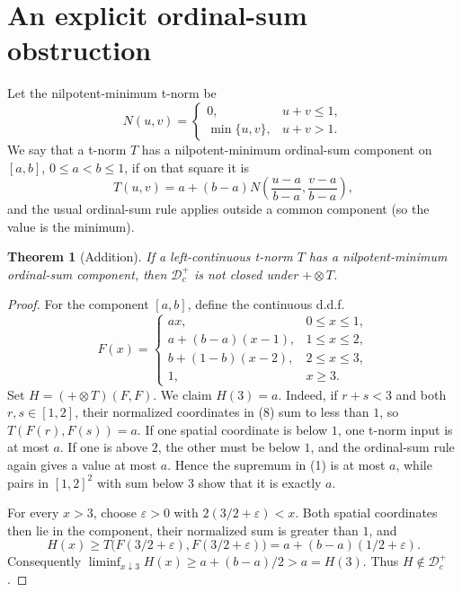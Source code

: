 \documentclass[11pt]{article}
\newtheorem{theorem}{Theorem}
\theoremstyle{remark}
\newcommand{\Dc}{\mathcal D_c^+}
\newcommand{\tens}{\mathbin{\otimes}}
\begin{document}
\section{An explicit ordinal-sum obstruction}

Let the nilpotent-minimum t-norm be
\[
 N(u,v)=
 \begin{cases}
  0,&u+v\le1,\\
  \min\{u,v\},&u+v>1.
 \end{cases}                                                    \tag{7}
\]
We say that a t-norm \(T\) has a nilpotent-minimum ordinal-sum component
on \([a,b]\), \(0\le a<b\le1\), if on that square it is
\[
 T(u,v)=a+(b-a)N\left(\frac{u-a}{b-a},\frac{v-a}{b-a}\right),   \tag{8}
\]
and the usual ordinal-sum rule applies outside a common component (so the
value is the minimum).

\begin{theorem}[Addition]
\label{thm:add}
If a left-continuous t-norm \(T\) has a nilpotent-minimum ordinal-sum
component, then \(\Dc\) is not closed under \(+\tens T\).
\end{theorem}

\begin{proof}
For the component \([a,b]\), define the continuous d.d.f.
\[
 F(x)=
 \begin{cases}
   ax,&0\le x\le1,\\
   a+(b-a)(x-1),&1\le x\le2,\\
   b+(1-b)(x-2),&2\le x\le3,\\
   1,&x\ge3.
 \end{cases}                                                    \tag{9}
\]
Set \(H=(+\tens T)(F,F)\).  We claim \(H(3)=a\).  Indeed, if
\(r+s<3\) and both \(r,s\in[1,2]\), their normalized coordinates in (8)
sum to less than \(1\), so \(T(F(r),F(s))=a\).  If one spatial coordinate
is below \(1\), one t-norm input is at most \(a\).  If one is above \(2\),
the other must be below \(1\), and the ordinal-sum rule again gives a value
at most \(a\).  Hence the supremum in (1) is at most \(a\), while pairs in
\([1,2]^2\) with sum below \(3\) show that it is exactly \(a\).

For every \(x>3\), choose \(\varepsilon>0\) with
\(2(3/2+\varepsilon)<x\).  Both spatial coordinates then lie in the
component, their normalized sum is greater than \(1\), and
\[
 H(x)\ge
 T\bigl(F(3/2+\varepsilon),F(3/2+\varepsilon)\bigr)
 =a+(b-a)(1/2+\varepsilon).                                   \tag{10}
\]
Consequently
\(\liminf_{x\downarrow3}H(x)\ge a+(b-a)/2>a=H(3)\).
Thus \(H\notin\Dc\).
\end{proof}
\end{document}

